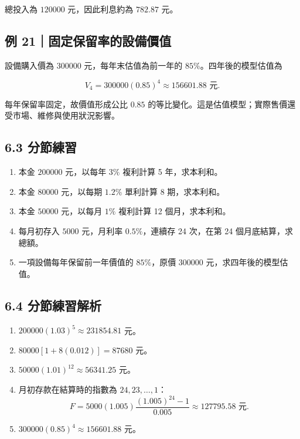 \documentclass[11pt,a4paper]{article}
\providecommand{\tightlist}{%
  \setlength{\itemsep}{0pt}\setlength{\parskip}{0pt}}
\begin{document}
總投入為 \(120000\) 元，因此利息約為 \(782.87\) 元。

\subsection{例 21｜固定保留率的設備價值}\label{ux4f8b-21ux56faux5b9aux4fddux7559ux7387ux7684ux8a2dux5099ux50f9ux503c}

設備購入價為 \(300000\) 元，每年末估值為前一年的 \(85\%\)。四年後的模型估值為

\[
V_4=300000(0.85)^4\approx156601.88\text{ 元}.
\]

每年保留率固定，故價值形成公比 \(0.85\) 的等比變化。這是估值模型；實際售價還受市場、維修與使用狀況影響。

\subsection{6.3 分節練習}\label{ux5206ux7bc0ux7df4ux7fd2-5}

\begin{enumerate}
\def\labelenumi{\arabic{enumi}.}
\tightlist
\item
  本金 \(200000\) 元，以每年 \(3\%\) 複利計算 5 年，求本利和。
\item
  本金 \(80000\) 元，以每期 \(1.2\%\) 單利計算 8 期，求本利和。
\item
  本金 \(50000\) 元，以每月 \(1\%\) 複利計算 12 個月，求本利和。
\item
  每月初存入 \(5000\) 元，月利率 \(0.5\%\)，連續存 24 次，在第 24 個月底結算，求總額。
\item
  一項設備每年保留前一年價值的 \(85\%\)，原價 \(300000\) 元，求四年後的模型估值。
\end{enumerate}

\subsection{6.4 分節練習解析}\label{ux5206ux7bc0ux7df4ux7fd2ux89e3ux6790-5}

\begin{enumerate}
\def\labelenumi{\arabic{enumi}.}
\tightlist
\item
  \(200000(1.03)^5\approx231854.81\) 元。
\item
  \(80000[1+8(0.012)]=87680\) 元。
\item
  \(50000(1.01)^{12}\approx56341.25\) 元。
\item
  月初存款在結算時的指數為 \(24,23,\ldots,1\)：
  \[
  F=5000(1.005)\frac{(1.005)^{24}-1}{0.005}\approx127795.58\text{ 元}.
  \]
\item
  \(300000(0.85)^4\approx156601.88\) 元。
\end{enumerate}
\end{document}
